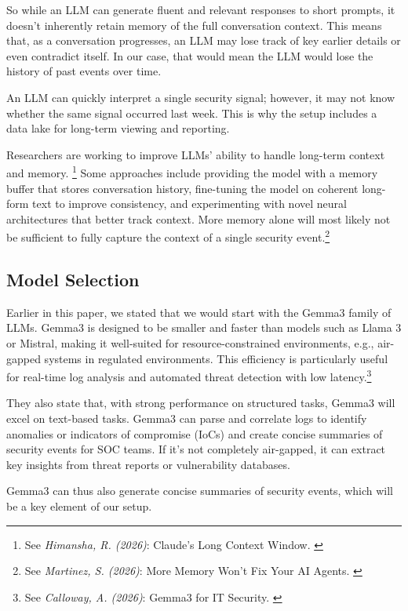 So while an LLM can generate fluent and relevant responses to short prompts, it doesn't inherently retain memory of the full conversation context. This means that, as a conversation progresses, an LLM may lose track of key earlier details or even contradict itself. In our case, that would mean the LLM would lose the history of past events over time.

An LLM can quickly interpret a single security signal; however, it may not know whether the same signal occurred last week. This is why the setup includes a data lake for long-term viewing and reporting.

Researchers are working to improve LLMs' ability to handle long-term context and memory. \footnote{See \textit{Himansha, R. (2026)}: Claude's Long Context Window. \cite{claudeContext}} Some approaches include providing the model with a memory buffer that stores conversation history, fine-tuning the model on coherent long-form text to improve consistency, and experimenting with novel neural architectures that better track context. More memory alone will most likely not be sufficient to fully capture the context of a single security event.\footnote{See \textit{Martinez, S. (2026)}: More Memory Won’t Fix Your AI Agents. \cite{moreMemory}}

\subsection{Model Selection}

Earlier in this paper, we stated that we would start with the Gemma3 family of LLMs. Gemma3 is designed to be smaller and faster than models such as Llama 3 or Mistral, making it well-suited for resource-constrained environments, e.g., air-gapped systems in regulated environments. This efficiency is particularly useful for real-time log analysis and automated threat detection with low latency.\footnote{See \textit{Calloway, A. (2026)}: Gemma3 for IT Security. \cite{gemma3}}

They also state that, with strong performance on structured tasks, Gemma3 will excel on text-based tasks. Gemma3 can parse and correlate logs to identify anomalies or indicators of compromise (IoCs) and create concise summaries of security events for SOC teams. If it's not completely air-gapped, it can extract key insights from threat reports or vulnerability databases.

Gemma3 can thus also generate concise summaries of security events, which will be a key element of our setup.

